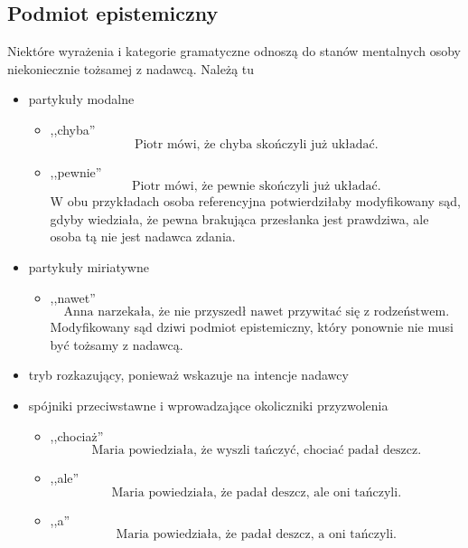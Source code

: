 \documentclass[a4paper, 12pt]{article}
\theoremstyle{remark}
\begin{document}
\subsection{Podmiot epistemiczny}
Niektóre wyrażenia i kategorie gramatyczne odnoszą do stanów mentalnych osoby niekoniecznie tożsamej z nadawcą. Należą tu
\begin{itemize}

\item partykuły modalne

	\begin{itemize}
	\item ,,chyba''
	\begin{equation}
		\text{Piotr mówi, że chyba skończyli już układać.}
	\end{equation}
	\item ,,pewnie''
	\begin{equation}
		\text{Piotr mówi, że pewnie skończyli już układać.}
	\end{equation}
	W obu przykładach osoba referencyjna potwierdziłaby modyfikowany sąd, gdyby wiedziała, że pewna brakująca przesłanka jest prawdziwa, ale osoba tą nie jest nadawca zdania.
	\end{itemize}

\item partykuły miriatywne

	\begin{itemize}
	\item ,,nawet''
	\begin{equation}
		\text{Anna narzekała, że nie przyszedł nawet przywitać się z rodzeństwem.}
	\end{equation}
	Modyfikowany sąd dziwi podmiot epistemiczny, który ponownie nie musi być tożsamy z nadawcą.
	\end{itemize}

\item tryb rozkazujący, ponieważ wskazuje na intencje nadawcy
\item spójniki przeciwstawne i wprowadzające okoliczniki przyzwolenia
	\begin{itemize}
		\item ,,chociaż''
		\begin{equation}
			\text{Maria powiedziała, że wyszli tańczyć, chociać padał deszcz.}
		\end{equation}
		\item ,,ale''
		\begin{equation}
			\text{Maria powiedziała, że padał deszcz, ale oni tańczyli.}
		\end{equation}
		\item ,,a''
		\begin{equation}
			\text{Maria powiedziała, że padał deszcz, a oni tańczyli.}
		\end{equation}
	\end{itemize}

\end{itemize}
\end{document}
